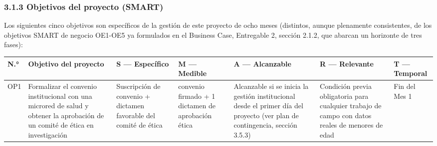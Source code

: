 \documentclass[11pt,a4paper]{article}
\begin{document}
\subsubsection{3.1.3 Objetivos del proyecto (SMART)}\label{objetivos-del-proyecto-smart}

Los siguientes cinco objetivos son específicos de la gestión de este proyecto de ocho meses (distintos, aunque plenamente consistentes, de los objetivos SMART de negocio OE1-OE5 ya formulados en el Business Case, Entregable 2, sección 2.1.2, que abarcan un horizonte de tres fases):

{\small
\begin{longtable}[]{@{}
  >{\raggedright\arraybackslash}p{}
  >{\raggedright\arraybackslash}p{}
  >{\raggedright\arraybackslash}p{}
  >{\raggedright\arraybackslash}p{}
  >{\raggedright\arraybackslash}p{}
  >{\raggedright\arraybackslash}p{}
  >{\raggedright\arraybackslash}p{}@{}}
\toprule\noalign{}
\begin{minipage}[b]{\linewidth}\raggedright
N.°
\end{minipage} & \begin{minipage}[b]{\linewidth}\raggedright
Objetivo del proyecto
\end{minipage} & \begin{minipage}[b]{\linewidth}\raggedright
S --- Específico
\end{minipage} & \begin{minipage}[b]{\linewidth}\raggedright
M --- Medible
\end{minipage} & \begin{minipage}[b]{\linewidth}\raggedright
A --- Alcanzable
\end{minipage} & \begin{minipage}[b]{\linewidth}\raggedright
R --- Relevante
\end{minipage} & \begin{minipage}[b]{\linewidth}\raggedright
T --- Temporal
\end{minipage} \\
\midrule\noalign{}
\endhead
\bottomrule\noalign{}
\endlastfoot
OP1 & Formalizar el convenio institucional con una microred de salud y obtener la aprobación de un comité de ética en investigación & Suscripción de convenio + dictamen favorable del comité de ética & 1 convenio firmado + 1 dictamen de aprobación ética & Alcanzable si se inicia la gestión institucional desde el primer día del proyecto (ver plan de contingencia, sección 3.5.3) & Condición previa obligatoria para cualquier trabajo de campo con datos reales de menores de edad & Fin del Mes 1 \\

\end{longtable}}
\end{document}
